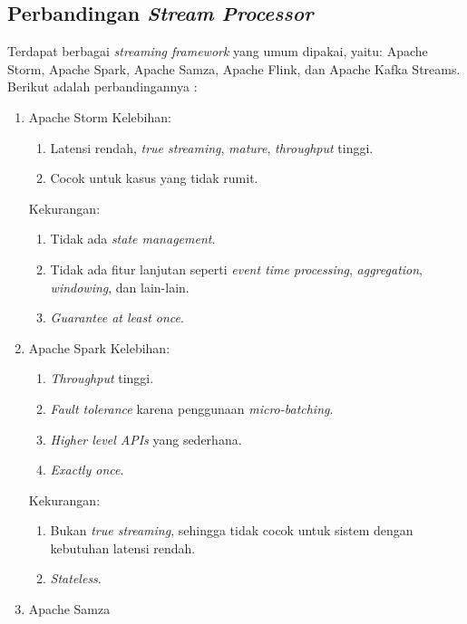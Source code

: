 \subsection{Perbandingan \textit{Stream Processor}}

Terdapat berbagai \textit{streaming framework} yang umum dipakai, yaitu: Apache Storm, Apache Spark, Apache Samza, Apache Flink, dan Apache Kafka Streams. Berikut adalah perbandingannya \parencite{streamProcessingComparison}:

\begin{enumerate}
    \item Apache Storm
          Kelebihan:
          \begin{enumerate}
              \item Latensi rendah, \textit{true streaming}, \textit{mature}, \textit{throughput} tinggi.
              \item Cocok untuk kasus yang tidak rumit.
          \end{enumerate}
          Kekurangan:
          \begin{enumerate}
              \item Tidak ada \textit{state management}.
              \item Tidak ada fitur lanjutan seperti \textit{event time processing}, \textit{aggregation}, \textit{windowing}, dan lain-lain.
              \item \textit{Guarantee at least once}.
          \end{enumerate}
    \item Apache Spark
          Kelebihan:
          \begin{enumerate}
              \item \textit{Throughput} tinggi.
              \item \textit{Fault tolerance} karena penggunaan \textit{micro-batching}.
              \item \textit{Higher level APIs} yang sederhana.
              \item \textit{Exactly once}.
          \end{enumerate}
          Kekurangan:
          \begin{enumerate}
              \item Bukan \textit{true streaming}, sehingga tidak cocok untuk sistem dengan kebutuhan latensi rendah.
              \item \textit{Stateless}.
          \end{enumerate}
    \item Apache Samza

\end{enumerate}
